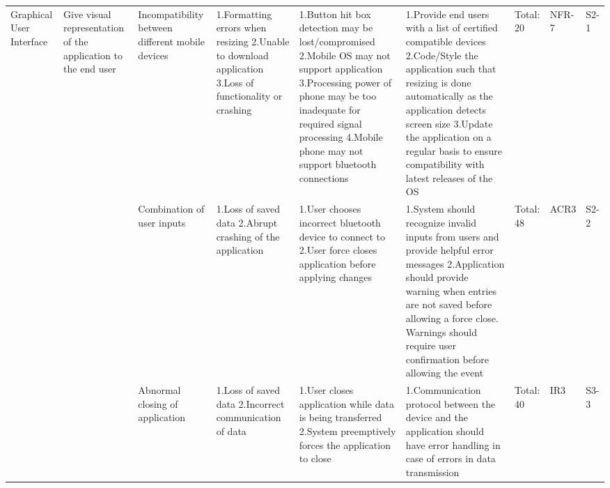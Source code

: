\documentclass{article}
\begin{document}
\begin{landscape}
\begin{table}[H]
\begin{tabular}{| p{} | p{}  | p{} | p{} | p{} | p{} | p{} | p{} | p{} |}
    Graphical User Interface & Give visual representation of the application to the end user & Incompatibility between different mobile devices  & 1.Formatting errors when resizing \newline 2.Unable to download application \newline 3.Loss of functionality or crashing & 1.Button hit box detection may be lost/compromised \newline 2.Mobile OS may not support application \newline 3.Processing power of phone may be too  inadequate for required signal processing \newline 4.Mobile phone may not support bluetooth connections  & 1.Provide end users with a list of certified compatible devices \newline 2.Code/Style the application such that resizing is done automatically as the application detects screen size \newline 3.Update the application on a regular basis to ensure compatibility with latest releases of the OS  & Total: 20 & NFR-7 & S2-1 \\ \cline{3-9}

     & & Combination of user inputs & 1.Loss of saved data \newline 2.Abrupt crashing of the application  &  1.User chooses incorrect bluetooth device to connect to \newline 2.User force closes application before applying changes  &  1.System should recognize invalid inputs from users and provide helpful error messages \newline 2.Application should provide warning when entries are not saved before allowing a force close. Warnings should require user confirmation before allowing the event  & Total: 48 & ACR3 & S2-2 \\ \cline{3-9}

     & & Abnormal closing of application & 1.Loss of saved data \newline 2.Incorrect communication of data  & 1.User closes application while data is being transferred \newline 2.System preemptively forces the application to close & 1.Communication protocol between the device and the application should have error handling in case of errors in data transmission  & Total: 40 & IR3 & S3-3 \\ \hline
    
    \end{tabular}
    \hspace*{-1cm}
    \end{table}

\end{landscape}
\end{document}
